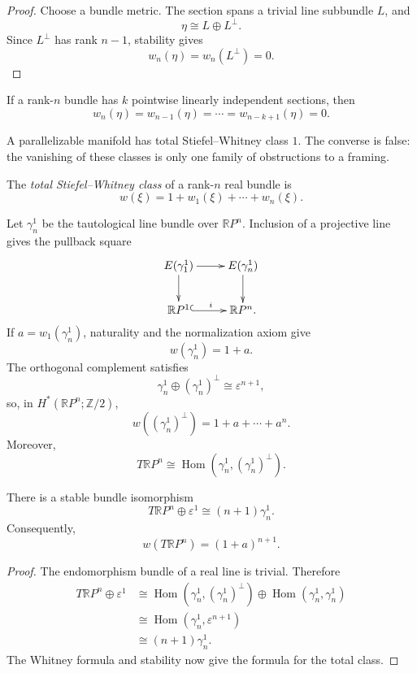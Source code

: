\begin{proof}
Choose a bundle metric.  The section spans a
trivial line subbundle $L$, and
$$
\eta\cong L\oplus L^\perp.
$$
Since $L^\perp$ has rank $n-1$, stability
gives
$$
w_n(\eta)=w_n(L^\perp)=0.
$$
\end{proof}

\begin{corollary}
\label{at-lemma-sections-kill-sw-classes}
If a rank-$n$ bundle has $k$ pointwise
linearly independent sections, then
$$
w_n(\eta)=w_{n-1}(\eta)=\cdots
=w_{n-k+1}(\eta)=0.
$$
\end{corollary}

\begin{remark}
\label{at-remark-parallelizable-sw}
A parallelizable manifold has total
Stiefel--Whitney class $1$.  The converse is
false: the vanishing of these classes is only
one family of obstructions to a framing.
\end{remark}

\begin{definition}
\label{at-definition-total-sw-class}
The \emph{total Stiefel--Whitney class} of a
rank-$n$ real bundle is
$$
w(\xi)=1+w_1(\xi)+\cdots+w_n(\xi).
$$
\end{definition}

Let $\gamma_n^1$ be the tautological line
bundle over $\mathbb{R}P^n$.  Inclusion of a
projective line gives the pullback square
$$
\xymatrix{
E(\gamma_1^1)\ar[r]\ar[d]&
E(\gamma_n^1)\ar[d]\\
\mathbb{R}P^1\ar@{^{(}->}[r]^i&
\mathbb{R}P^n.
}
$$
If $a=w_1(\gamma_n^1)$, naturality and the
normalization axiom give
$$
w(\gamma_n^1)=1+a.
$$
The orthogonal complement satisfies
$$
\gamma_n^1\oplus(\gamma_n^1)^\perp
\cong\varepsilon^{n+1},
$$
so, in
$H^*(\mathbb{R}P^n;\mathbb{Z}/2)$,
$$
w((\gamma_n^1)^\perp)
=1+a+\cdots+a^n.
$$
Moreover,
$$
T\mathbb{R}P^n
\cong
\operatorname{Hom}
(\gamma_n^1,(\gamma_n^1)^\perp).
$$

\begin{theorem}
\label{at-theorem-projective-tangent-stable}
There is a stable bundle isomorphism
$$
T\mathbb{R}P^n\oplus\varepsilon^1
\cong(n+1)\gamma_n^1.
$$
Consequently,
$$
w(T\mathbb{R}P^n)=(1+a)^{n+1}.
$$
\end{theorem}

\begin{proof}
The endomorphism bundle of a real line is
trivial.  Therefore
$$
\begin{aligned}
T\mathbb{R}P^n\oplus\varepsilon^1
&\cong
\operatorname{Hom}
(\gamma_n^1,(\gamma_n^1)^\perp)
\oplus
\operatorname{Hom}
(\gamma_n^1,\gamma_n^1)\\
&\cong
\operatorname{Hom}
(\gamma_n^1,\varepsilon^{n+1})\\
&\cong(n+1)\gamma_n^1.
\end{aligned}
$$
The Whitney formula and stability now give
the formula for the total class.
\end{proof}

